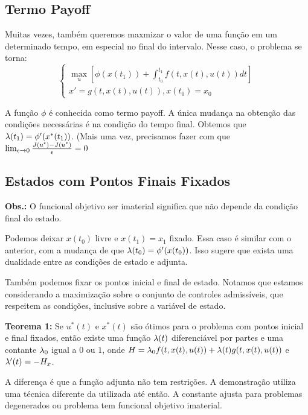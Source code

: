 \subsection{Termo Payoff}


Muitas vezes, também queremos maxmizar o valor de uma função em um determinado tempo, em especial no final do intervalo. Nesse caso, o problema se torna:
\begin{equation*}
    \begin{cases}
    \max_u [\phi(x(t_1)) + \int_{t_0}^{t_1} f(t, x(t),u(t))dt] \\
    x' = g(t,x(t),u(t)), x(t_0) = x_0
    \end{cases}
\end{equation*}

A função $\phi$ é conhecida como termo payoff. A única mudança na obtenção das condições necessárias é na condição do tempo final. Obtemos que $\lambda(t_1) = \phi '(x^*(t_1))$. (Mais uma vez, precisamos fazer com que $\lim_{\epsilon \to 0} \frac{J(u^{\epsilon}) - J(u^*)}{\epsilon} = 0$

\subsection{Estados com Pontos Finais Fixados}

\textbf{Obs.:} O funcional objetivo ser imaterial significa que não depende da condição final do estado. 

Podemos deixar $x(t_0)$ livre e $x(t_1) = x_1$ fixado. Essa caso é similar com o anterior, com a mudança de que $\lambda(t_0) = \phi '(x(t_0))$. Isso sugere que exista uma dualidade entre as condições de estado e adjunta.

Também podemos fixar os pontos inicial e final de estado. Notamos que estamos considerando a maximização sobre o conjunto de controles admissíveis, que respeitem as condições, inclusive sobre a variável de estado. 

\textbf{Teorema 1:} Se $u^*(t)$ e $x^*(t)$ são ótimos para o problema com pontos inicial e final fixados, então existe uma função $\lambda(t)$ diferenciável por partes e uma contante $\lambda_0$ igual a $0$ ou $1$, onde $H = \lambda_0f(t,x(t),u(t)) + \lambda(t)g(t,x(t),u(t))$ e $\lambda '(t) = - H_x$. 

A diferença é que a função adjunta não tem restrições. A demonstração utiliza uma técnica diferente da utilizada até então. A constante ajusta para problemas degenerados ou problema tem funcional objetivo imaterial.